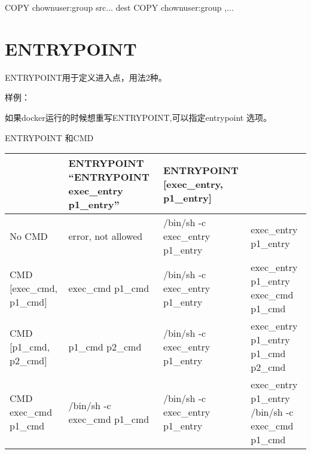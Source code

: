\documentclass[letterpaper,10pt,english]{sphinxmanual}
\begin{document}
%
\begin{sphinxVerbatim}[commandchars=\\\{\}]
COPY \PYG{o}{[}\PYGZhy{}\PYGZhy{}chown\PYGZlt{}user\PYGZgt{}:\PYGZlt{}group\PYGZgt{}\PYG{o}{]} \PYGZlt{}src\PYGZgt{}... \PYGZlt{}dest\PYGZgt{}
COPY \PYG{o}{[}\PYGZhy{}\PYGZhy{}chown\PYGZlt{}user\PYGZgt{}:\PYGZlt{}group\PYGZgt{}\PYG{o}{]} \PYG{o}{[},... \PYG{o}{]}
\end{sphinxVerbatim}


\section{ENTRYPOINT}
\label{\detokenize{_u8fd0_u884c_u5e94_u7528/05-dockerfile_u53c2_u8003:entrypoint}}
ENTRYPOINT用于定义进入点，用法2种。

%
\begin{sphinxVerbatim}[commandchars=\\\{\}]
\end{sphinxVerbatim}

样例：

%
\begin{sphinxVerbatim}[commandchars=\\\{\}]
\end{sphinxVerbatim}

如果docker运行的时候想重写ENTRYPOINT,可以指定\textendash{}entrypoint 选项。

ENTRYPOINT 和CMD


\begin{savenotes}\sphinxattablestart
\centering
\begin{tabulary}{\linewidth}[t]{|T|T|T|T|}
\hline
\sphinxstyletheadfamily &\sphinxstyletheadfamily 
ENTRYPOINT     “ENTRYPOINT exec\_entry p1\_entry”
&\sphinxstyletheadfamily 
ENTRYPOINT {[}exec\_entry, p1\_entry{]}
&\sphinxstyletheadfamily \\
\hline
No CMD
&
error, not allowed
&
/bin/sh -c exec\_entry p1\_entry
&
exec\_entry p1\_entry
\\
\hline
CMD {[}exec\_cmd, p1\_cmd{]}
&
exec\_cmd p1\_cmd
&
/bin/sh -c exec\_entry p1\_entry
&
exec\_entry p1\_entry exec\_cmd p1\_cmd
\\
\hline
CMD {[}p1\_cmd, p2\_cmd{]}
&
p1\_cmd p2\_cmd
&
/bin/sh -c exec\_entry p1\_entry
&
exec\_entry p1\_entry p1\_cmd p2\_cmd
\\
\hline
CMD exec\_cmd p1\_cmd
&
/bin/sh -c exec\_cmd p1\_cmd
&
/bin/sh -c exec\_entry p1\_entry
&
exec\_entry p1\_entry /bin/sh -c exec\_cmd p1\_cmd
\\
\hline
\end{tabulary}
\par
\sphinxattableend\end{savenotes}
\end{document}
